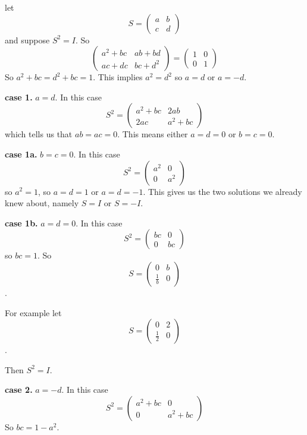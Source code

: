 \documentclass[oneside,12pt]{amsart}
\begin{document}
let $$S=
\begin{pmatrix}
a & b \\
c & d
\end{pmatrix}
$$
and suppose $S^2=I$.
So
$$
\begin{pmatrix}
a^2+bc & ab+bd \\
ac+dc & bc+d^2
\end{pmatrix}
=
\begin{pmatrix}
1 & 0 \\
0 & 1
\end{pmatrix}
$$
So $a^2 + bc = d^2 + bc = 1$. This implies
$a^2=d^2$ so $a=d$ or $a=-d$.

\smallskip

\textbf{case 1.} $a=d$.
In this case
$$
S^2=
\begin{pmatrix}
a^2+bc & 2ab \\
2ac & a^2+bc
\end{pmatrix}
$$
which tells us that $ab=ac=0$. This means either $a=d=0$ or $b=c=0$.

\smallskip

\textbf{case 1a.} $b=c=0$.
In this case
$$
S^2=
\begin{pmatrix}
a^2 & 0 \\
0 & a^2
\end{pmatrix}
$$
so $a^2=1$, so $a=d=1$ or $a=d=-1$.
This gives us the two solutions we already knew about, namely
$S=I$ or $S=-I$.

\smallskip

\textbf{case 1b.} $a=d=0$.
In this case
$$
S^2=
\begin{pmatrix}
bc & 0 \\
0 & bc
\end{pmatrix}
$$
so $bc=1$.
So
$$
S=
\begin{pmatrix}
0 & b \\
\frac{1}{b} & 0
\end{pmatrix}
$$.

For example let
$$
S=
\begin{pmatrix}
0 & 2 \\
\frac{1}{2} & 0
\end{pmatrix}
$$.

Then $S^2=I$.

\smallskip

\textbf{case 2.} $a=-d$.
In this case
$$
S^2=
\begin{pmatrix}
a^2+bc & 0 \\
0 & a^2+bc
\end{pmatrix}
$$
So $bc = 1 - a^2$.
\end{document}
